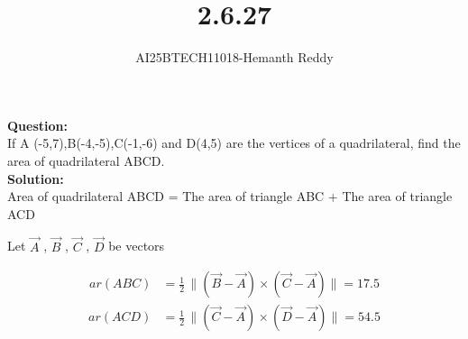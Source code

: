 \documentclass[journal]{IEEEtran}
\begin{document}

\vspace{3cm}

\title{2.6.27}
\author{AI25BTECH11018-Hemanth Reddy}
 \maketitle
{\let\newpage\relax\maketitle}

\renewcommand{\thefigure}{\theenumi}
\renewcommand{\thetable}{\theenumi}
\setlength{\intextsep}{10pt} %


\renewcommand{\thetable}{\theenumi}

\textbf{Question:}\\
If A (-5,7),B(-4,-5),C(-1,-6) and D(4,5) are the vertices of a quadrilateral, find
 the area of quadrilateral ABCD.\\
\textbf{Solution:}\\

Area of quadrilateral ABCD = The area of triangle ABC + The area of triangle ACD\\

\vspace{0.4cm}

Let 
$\vec{A}$ ,
$\vec{B}$ ,
$\vec{C}$ ,
$\vec{D}$ 
be vectors\\

\begin{align}
ar(ABC) &= \frac{1}{2} \, \|(\vec{B} - \vec{A}) \times (\vec{C} - \vec{A}) \|  =  17.5
\end{align}
\begin{align}
ar(ACD) &= \frac{1}{2} \, \|(\vec{C} - \vec{A}) \times (\vec{D} - \vec{A}) \|  =  54.5
\end{align}
\end{document}
